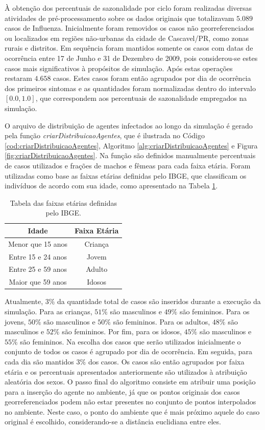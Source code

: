 À obtenção dos percentuais de sazonalidade por ciclo foram realizadas diversas atividades de pré-processamento sobre os dados originais que totalizavam $5.089$ casos de Influenza. Inicialmente foram removidos os casos não georreferenciados ou localizados em regiões não-urbanas da cidade de Cascavel/PR, como zonas rurais e distritos. Em sequência foram mantidos somente os casos com datas de ocorrência entre 17 de Junho e 31 de Dezembro de 2009, pois considerou-se estes casos mais significativos à propósitos de simulação. Após estas operações restaram $4.658$ casos. Estes casos foram então agrupados por dia de ocorrência dos primeiros sintomas e as quantidades foram normalizadas dentro do intervalo $[0.0, 1.0]$, que correspondem aos percentuais de sazonalidade empregados na simulação.

O arquivo de distribuição de agentes infectados ao longo da simulação é gerado pela função \textit{criarDistribuicaoAgentes}, que é ilustrada no Código \ref{cod:criarDistribuicaoAgentes}, Algoritmo \ref{alg:criarDistribuicaoAgentes} e Figura \ref{fig:criarDistribuicaoAgentes}. Na função são definidos manualmente percentuais de casos utilizados e frações de machos e fêmeas para cada faixa etária. Foram utilizadas como base as faixas etárias definidas pelo IBGE, que classificam os indivíduos de acordo com sua idade, como apresentado na Tabela \ref{tab:faixasEtariasIBGE}.  

\begin{table}[H]
\centering
\begin{tabular}{c|c}
 \textbf{Idade} 	& \textbf{Faixa Etária}	\\ \hline
 Menor que 15 anos 	& Criança		\\
 Entre 15 e 24 anos 	& Jovem			\\
 Entre 25 e 59 anos 	& Adulto		\\
 Maior que 59 anos 	& Idosos		\\
\end{tabular}
\caption{Tabela das faixas etárias definidas pelo IBGE.}
\label{tab:faixasEtariasIBGE}
\end{table}

Atualmente, $3\%$ da quantidade total de casos são inseridos durante a execução da simulação. Para as crianças, $51\%$ são masculinos e $49\%$ são femininos. Para os jovens, $50\%$ são masculinos e $50\%$ são femininos. Para os adultos, $48\%$ são masculinos e $52\%$ são femininos. Por fim, para os idosos, $45\%$ são masculinos e $55\%$ são femininos. Na escolha dos casos que serão utilizados inicialmente o conjunto de todos os casos é agrupado por dia de ocorrência. Em seguida, para cada dia são mantidos $3\%$ dos casos. Os casos são então agrupados por faixa etária e os percentuais apresentados anteriormente são utilizados à atribuição aleatória dos sexos. O passo final do algoritmo consiste em atribuir uma posição para a inserção do agente no ambiente, já que os pontos originais dos casos georreferenciados podem não estar presentes no conjunto de pontos interpolados no ambiente. Neste caso, o ponto do ambiente que é mais próximo aquele do caso original é escolhido, considerando-se a distância euclidiana entre eles. 

\newpage
